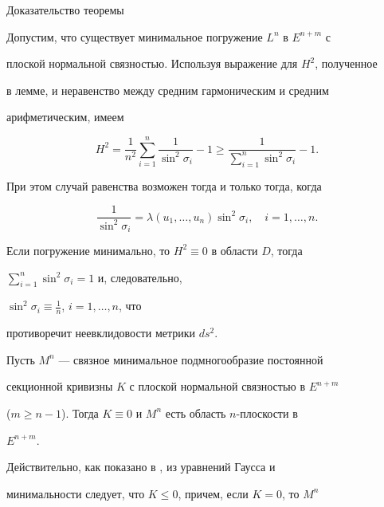 \begin{pf*}{Доказательство теоремы} 


Допустим, что существует минимальное погружение $L^n$ в $E^{n+m}$ с 


плоской нормальной связностью. Используя выражение для $H^2$, полученное 


в лемме, и неравенство между средним гармоническим и средним 


арифметическим, имеем 


$$ 


H^2=\frac{1}{n^2}\sum^n_{i=1}\frac{1}{\sin^2\sigma_i}-1\ge 


\frac{1}{\sum\limits^n_{i=1}\sin^2\sigma_i}-1. 


$$ 


При этом случай равенства возможен тогда и только тогда, когда 


$$ 


\frac{1}{\sin^2\sigma_i}=\lambda(u_1,\dotsc,u_n)\sin^2\sigma_i, 


\quad i=1,\dotsc,n. 


$$ 


Если погружение минимально, то $H^2\equiv 0$ в области $D$, тогда 


$\sum\limits^n_{i=1}\sin^2\sigma_i=1$ и, следовательно, 


$\sin^2\sigma_i\equiv\frac{1}{n}$, $i=1,\dotsc,n$, что 


противоречит неевклидовости метрики $ds^2$. 


\end{pf*} 


 


\begin{cornonum} 


Пусть $M^n$ --- связное минимальное подмногообразие постоянной 


секционной кривизны $K$ с плоской нормальной связностью в $E^{n+m}$ 


($m\ge n-1$). Тогда $K\equiv 0$ и $M^n$ есть область $n$-плоскости в 


$E^{n+m}$. 


\end{cornonum} 


 


Действительно, как показано в \cite{3}, из уравнений Гаусса и 


минимальности следует, что $K\le 0$, причем, если $K=0$, то $M^n$ 


